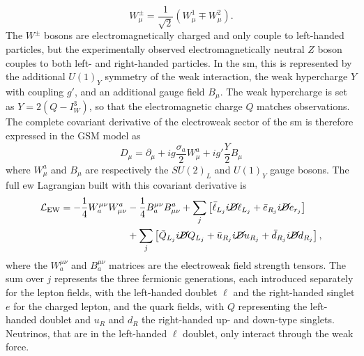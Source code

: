 \begin{equation}\label{eq-weak-lic}
    W_{\mu}^{\pm} = \frac{1}{\sqrt{2}} \left(W_{\mu}^{1} \mp W_{\mu}^{2} \right).
\end{equation}
The $W^{\pm}$ bosons are electromagnetically charged and only couple to left-handed particles, but the experimentally observed electromagnetically neutral $Z$ boson couples to both left- and right-handed particles. In the \gls{sm}, this is represented by the additional $U(1)_Y$ symmetry of the weak interaction, the weak hypercharge $Y$ with coupling $g'$, and an additional gauge field $B_{\mu}$. The weak hypercharge is set as $Y = 2 (Q - I_W^3)$, so that the electromagnetic charge $Q$ matches observations. The complete covariant derivative of the electroweak sector of the \gls{sm} is therefore expressed in the GSM model as 
\begin{equation}\label{eq-GaugeEW}
    D_{\mu}  = \partial_{\mu} + ig \frac{\sigma_a}{2} W_{\mu}^a + ig' \frac{Y}{2} B_{\mu}
\end{equation}
where $W_{\mu}^a$ and $B_{\mu}$ are respectively the $SU(2)_L$ and $U(1)_Y$ gauge bosons. The full \gls{ew} Lagrangian built with this covariant derivative is
\begin{equation}\label{eq-EWlag}
    \begin{split}
        \mathcal{L}_{\text{EW}} = - \frac{1}{4} W_a^{\mu\nu} W^a_{\mu\nu} &- \frac{1}{4} B_a^{\mu\nu} B^a_{\mu\nu} + \sum_{j} \left[ \bar{\ell}_{L_j}i\cancel{D}\ell_{L_j} + \bar{e}_{R_j}i\cancel{D}e_{r_j}  \right] \\
        &+ \sum_{j} \left[ \bar{Q}_{L_j}i\cancel{D}Q_{L_j} + \bar{u}_{R_j}i\cancel{D}u_{R_j} + \bar{d}_{R_j}i\cancel{D}d_{R_j} \right],
    \end{split}
\end{equation}
where the $W_a^{\mu\nu}$ and $B_a^{\mu\nu}$ matrices are the electroweak field strength tensors. The sum over $j$ represents the three fermionic generations, each introduced separately for the lepton fields, with the left-handed doublet $\ell$ and the right-handed singlet $e$ for the charged lepton, and the quark fields, with $Q$ representing the left-handed doublet and $u_R$ and $d_R$ the right-handed up- and down-type singlets. Neutrinos, that are in the left-handed $\ell$ doublet, only interact through the weak force. \\


